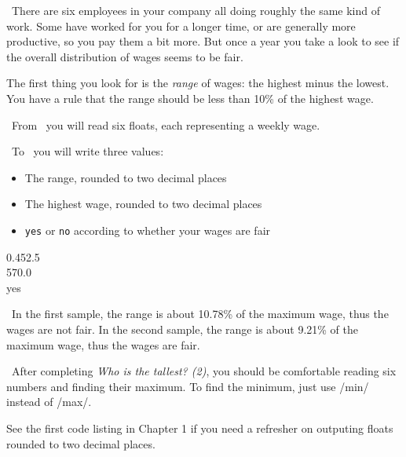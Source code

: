 

\Question\ There are six employees in your company all doing roughly the same kind of
work. Some have worked for you for a longer time, or are generally more productive, so you
pay them a bit more. But once a year you take a look to see if the overall distribution of
wages seems to be fair.

The first thing you look for is the \emph{range} of wages: the highest minus the lowest.
You have a rule that the range should be less than 10\% of the highest wage.

\Input\ From \IN\ you will read six floats, each representing a weekly wage.

\Output\ To \OUT\ you will write three values:
\begin{itemize}
  \item The range, rounded to two decimal places
  \item The highest wage, rounded to two decimal places
  \item \texttt{yes} or \texttt{no} according to whether your wages are fair
\end{itemize}

\Sample

             {
                     {0.4}{52.5\\570.0\\yes}}

\Explanation\ In the first sample, the range is about 10.78\% of the maximum wage, thus
the wages are not fair. In the second sample, the range is about 9.21\% of the maximum
wage, thus the wages are fair.

\Scratch\ After completing \emph{Who is the tallest? (2)}, you should be comfortable
reading six numbers and finding their maximum. To find the minimum, just use \pycode/min/
instead of \pycode/max/.

See the first code listing in Chapter 1 if you need a refresher on outputing floats
rounded to two decimal places.

